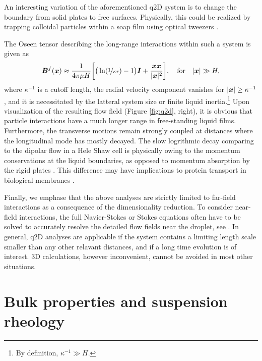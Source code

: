 \medskip
An interesting variation of the aforementioned q2D system is to change the boundary from solid plates to free surfaces. Physically, this could be realized by trapping colloidal particles within a soap film using optical tweezers \citep{Leonardo_etal_2008}.

The Oseen tensor describing the long-range interactions within such a system is given as \citep{Leonardo_etal_2008, Diamant}
\begin{equation}
 \begin{aligned}
   {\bm B}^f({\bm x}) \approx \frac{1}{4\pi\mu H} \bigg[ \big( \ln(\nicefrac{1}{\kappa r}) -1 \big) {\bm I} +\frac{{\bm x}{\bm x} }{ \lvert{\bm x}\rvert^2} \bigg],
   \quad \textrm{for} \quad \lvert\bm x\rvert \gg H,
 \end{aligned}
\end{equation}
where $\kappa^{-1}$ is a cutoff length, \ie the radial velocity component vanishes for $\lvert\bm x\rvert \geq \kappa^{-1}$, and it is necessitated by the latteral system size or finite liquid inertia.\footnote{By definition, $\kappa^{-1} \gg H$.}
Upon visualization of the resulting flow field (Figure \ref{fig:q2d}, right), it is obvious that particle interactions have a much longer range in free-standing liquid films. Furthermore, the transverse motions remain strongly coupled at distances where the longitudinal mode has mostly decayed.
The slow logrithmic decay comparing to the dipolar flow in a Hele Shaw cell is physically owing to the momentum conservations at the liquid boundaries, as opposed to momentum absorption by the rigid plates \citep{Diamant}.
This difference may have implications to protein transport in biological membranes \citep{Saffman3111}.

\medskip
Finally, we emphase that the above analyses are strictly limited to far-field interactions as a consequence of the dimensionality reduction.
To consider near-field interactions, the full Navier-Stokes or Stokes equations often have to be solved to accurately resolve the detailed flow fields near the droplet, see \eg \cite{zhu_gallaire_2016, flow-assist}. 
In general, q2D analyses are applicable if the system contains a limiting length scale smaller than any other relavant distances, and if a long time evolution is of interest.
3D calculations, however inconvenient, cannot be avoided in most other situations.


\section{Bulk properties and suspension rheology}
\label{sec:sus-rheo}

